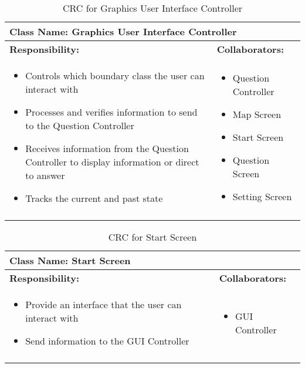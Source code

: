 \documentclass[titlepage]{article}
\begin{document}
\newpage	
	\begin{longtable}{| p{} | p{} |}
			\hline
			 \multicolumn{2}{|l|}{\textbf{Class Name: Graphics User Interface Controller}} \\
			\hline
			\textbf{Responsibility:} & \textbf{Collaborators:} \\
			\hline
				\begin{itemize}
					\item Controls which boundary class the user can interact with
					\item Processes and verifies information to send to the Question Controller
					\item Receives information from the Question Controller to display information or direct to answer
					\item Tracks the current and past state
				\end{itemize} & 
				\begin{itemize}
					\item Question Controller
					\item Map Screen
					\item Start Screen
					\item Question Screen
					\item Setting Screen
				\end{itemize} 
				\\
			\hline
		\caption{CRC for Graphics User Interface Controller}
	\end{longtable}
	
	\begin{longtable}{| p{} | p{} |}
			\hline
			 \multicolumn{2}{|l|}{\textbf{Class Name: Start Screen}} \\
			\hline
			\textbf{Responsibility:} & \textbf{Collaborators:} \\
			\hline
				\begin{itemize}
					\item Provide an interface that the user can interact with
					\item Send information to the GUI Controller
				\end{itemize} & 
				\begin{itemize}
					\item GUI Controller
				\end{itemize} 
				\\
			\hline
		\caption{CRC for Start Screen}
	\end{longtable}
	
\end{document}
